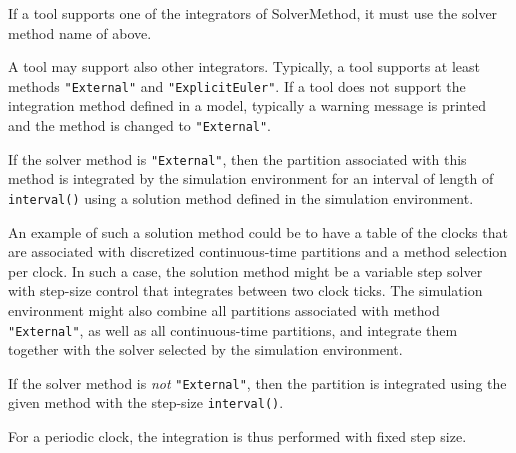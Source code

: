 If a tool supports one of the integrators of SolverMethod, it must use
the solver method name of above.

\begin{nonnormative}
A tool may support also other integrators.  Typically, a tool supports at least methods \lstinline!"External"! and \lstinline!"ExplicitEuler"!. If a tool does not support the
integration method defined in a model, typically a warning message is printed and the method is changed to \lstinline!"External"!.
\end{nonnormative}

If the solver method is \lstinline!"External"!, then the partition associated with this method is integrated by the simulation environment for an interval of length of
\lstinline!interval()! using a solution method defined in the simulation environment.

\begin{nonnormative}
An example of such a solution method could be to have a table of the clocks that are associated with discretized continuous-time partitions and a method selection per clock.  In such
a case, the solution method might be a variable step solver with step-size control that integrates between two clock ticks. The simulation environment might also combine all partitions associated with method \lstinline!"External"!, as well as all continuous-time partitions, and integrate them together with the solver selected by the simulation environment.
\end{nonnormative}

If the solver method is \emph{not} \lstinline!"External"!, then the partition is
integrated using the given method with the step-size \lstinline!interval()!.

\begin{nonnormative}
For a periodic clock, the integration is thus performed with fixed step size.
\end{nonnormative}

